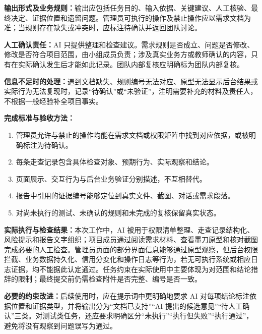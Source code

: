 \documentclass[heading=true,UTF8,a4paper,zihao=-4]{ctexart}
\begin{document}
\textbf{输出形式及业务规则：}输出应包括任务目的、输入依据、关键建议、人工核验、最终决定、证据位置和遗留问题。管理员可执行的操作及禁止操作应以需求文档为准；当规则存在缺失或冲突时，应标注待确认并返回团队讨论。

\textbf{人工确认责任：}AI 只提供整理和检查建议。需求规则是否成立、问题是否修改、修改是否符合项目范围，由小组成员负责；涉及真实业务方或教师确认的内容，只有在实际确认发生后才能如此记录。团队内部复核应明确标为团队内部复核。

\textbf{信息不足时的处理：}遇到文档缺失、规则编号无法对应、原型无法显示后台结果或实际行为无法复现时，记录“待确认”或“未验证”，注明需要补充的材料及责任人，不根据一般经验补全项目事实。

\textbf{完成标准与验收方法：}
\begin{enumerate}
\item 管理员允许与禁止的操作均能在需求文档或权限矩阵中找到对应依据，或被明确标注为待确认。
\item 每条走查记录包含具体检查对象、预期行为、实际观察和结论。
\item 页面展示、交互行为与后台业务验证分别描述，不互相替代。
\item 报告中引用的证据编号能够定位到真实文件、截图、对话或需求段落。
\item 对尚未执行的测试、未确认的规则和未完成的复核保留真实状态。
\end{enumerate}

\textbf{实际执行与检查结果：}本次工作中，AI 被用于权限清单整理、走查记录结构化、风险提示和报告文字组织；项目成员通过阅读需求材料、查看墨刀原型和核对截图完成必要的人工检查。管理员页面的部分界面信息能够通过原型观察，但后台权限拦截、业务数据持久化、信用分变化和操作日志等行为，若无可执行系统或相应日志证据，均不能据此认定通过。任务约束在实际使用中主要体现为对范围和结论措辞的限制；最终提交前仍需检查附件是否完整、编号是否一致。

\textbf{必要的约束改进：}后续使用时，应在提示词中更明确地要求 AI 对每项结论标注依据位置和证据类型，并将输出分为“文档已支持”“AI 提出的候选意见”“待人工确认”三类。对测试类任务，还应要求明确区分“未执行”“执行但失败”“执行通过”，避免将没有观察到问题误写为通过。
\end{document}
